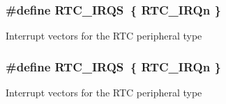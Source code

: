 \subsubsection[{\texorpdfstring{R\+T\+C\+\_\+\+I\+R\+QS}{RTC_IRQS}}]{\setlength{\rightskip}{0pt plus 5cm}\#define R\+T\+C\+\_\+\+I\+R\+QS~\{ {\bf R\+T\+C\+\_\+\+I\+R\+Qn} \}}\hypertarget{group__RTC__Peripheral__Access__Layer_gaa24243a5e7ef8be5eeeedde3eaaa366e}{}\label{group__RTC__Peripheral__Access__Layer_gaa24243a5e7ef8be5eeeedde3eaaa366e}
Interrupt vectors for the R\+TC peripheral type 
\subsubsection[{\texorpdfstring{R\+T\+C\+\_\+\+I\+R\+QS}{RTC_IRQS}}]{\setlength{\rightskip}{0pt plus 5cm}\#define R\+T\+C\+\_\+\+I\+R\+QS~\{ {\bf R\+T\+C\+\_\+\+I\+R\+Qn} \}}\hypertarget{group__RTC__Peripheral__Access__Layer_gaa24243a5e7ef8be5eeeedde3eaaa366e}{}\label{group__RTC__Peripheral__Access__Layer_gaa24243a5e7ef8be5eeeedde3eaaa366e}
Interrupt vectors for the R\+TC peripheral type 